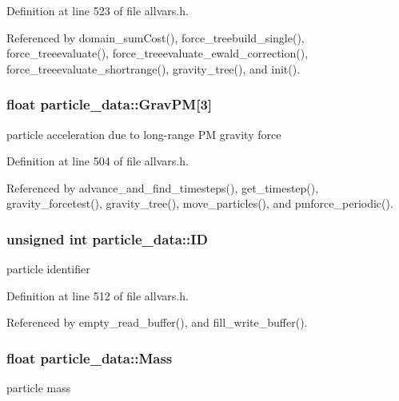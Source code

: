 Definition at line 523 of file allvars.h.



Referenced by domain\_\-sumCost(), force\_\-treebuild\_\-single(), force\_\-treeevaluate(), force\_\-treeevaluate\_\-ewald\_\-correction(), force\_\-treeevaluate\_\-shortrange(), gravity\_\-tree(), and init().

\hypertarget{structparticle__data_a66cad4fae4501e68c9be5f6c643a8798}{
\subsubsection[{GravPM}]{\setlength{\rightskip}{0pt plus 5cm}float {\bf particle\_\-data::GravPM}\mbox{[}3\mbox{]}}}
\label{structparticle__data_a66cad4fae4501e68c9be5f6c643a8798}
particle acceleration due to long-\/range PM gravity force 

Definition at line 504 of file allvars.h.



Referenced by advance\_\-and\_\-find\_\-timesteps(), get\_\-timestep(), gravity\_\-forcetest(), gravity\_\-tree(), move\_\-particles(), and pmforce\_\-periodic().

\hypertarget{structparticle__data_aefa92af245e44af30d28799ab1419e74}{
\subsubsection[{ID}]{\setlength{\rightskip}{0pt plus 5cm}unsigned int {\bf particle\_\-data::ID}}}
\label{structparticle__data_aefa92af245e44af30d28799ab1419e74}
particle identifier 

Definition at line 512 of file allvars.h.



Referenced by empty\_\-read\_\-buffer(), and fill\_\-write\_\-buffer().

\hypertarget{structparticle__data_a710e551be01f4ef85442d0928aca728c}{
\subsubsection[{Mass}]{\setlength{\rightskip}{0pt plus 5cm}float {\bf particle\_\-data::Mass}}}
\label{structparticle__data_a710e551be01f4ef85442d0928aca728c}
particle mass 


